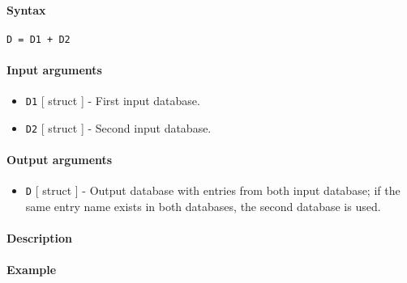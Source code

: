 


	\paragraph{Syntax}

\begin{verbatim}
D = D1 + D2
\end{verbatim}

\paragraph{Input arguments}

\begin{itemize}
\item
  \texttt{D1} {[} struct {]} - First input database.
\item
  \texttt{D2} {[} struct {]} - Second input database.
\end{itemize}

\paragraph{Output arguments}

\begin{itemize}
\itemsep1pt\parskip0pt
\item
  \texttt{D} {[} struct {]} - Output database with entries from both
  input database; if the same entry name exists in both databases, the
  second database is used.
\end{itemize}

\paragraph{Description}

\paragraph{Example}


